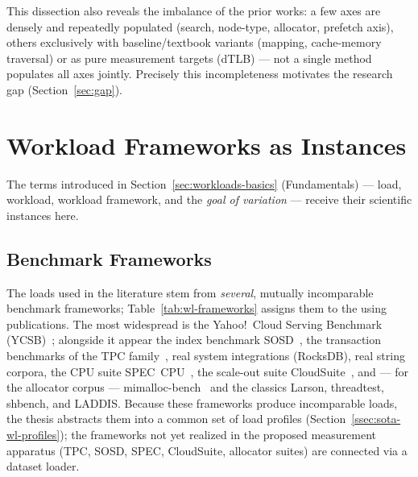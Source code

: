 This dissection also reveals the imbalance of the prior works: a few axes are densely and repeatedly
populated (search, node-type, allocator, prefetch axis), others exclusively with baseline/textbook
variants (mapping, cache-memory traversal) or as pure measurement targets (dTLB) --- not a single
method populates all axes jointly. Precisely this incompleteness motivates the research gap
(Section~\ref{sec:gap}).

\section{Workload Frameworks as Instances}\label{sec:sota-workloads}
The terms introduced in Section~\ref{sec:workloads-basics} (Fundamentals) --- load, workload,
workload framework, and the \emph{goal of variation} --- receive their scientific instances here.

\subsection{Benchmark Frameworks}\label{ssec:sota-wl-frameworks}
The loads used in the literature stem from \emph{several}, mutually incomparable benchmark
frameworks; Table~\ref{tab:wl-frameworks} assigns them to the using publications. The most
widespread is the Yahoo!\ Cloud Serving Benchmark (YCSB)~\cite{cooper2010ycsb}; alongside it appear
the index benchmark SOSD~\cite{kipf2019sosd}, the transaction benchmarks of the TPC
family~\cite{tpc_benchmarks}, real system integrations (RocksDB), real string corpora, the CPU suite
SPEC~CPU~\cite{spec_cpu2017}, the scale-out suite CloudSuite~\cite{ferdman2012cloudsuite}, and ---
for the allocator corpus --- mimalloc-bench~\cite{mimalloc_bench} and the classics Larson,
threadtest, shbench, and LADDIS\@. Because these frameworks produce incomparable loads, the thesis
abstracts them into a common set of load profiles (Section~\ref{ssec:sota-wl-profiles}); the
frameworks not yet realized in the proposed measurement apparatus (TPC, SOSD, SPEC, CloudSuite,
allocator suites) are connected via a dataset loader.

